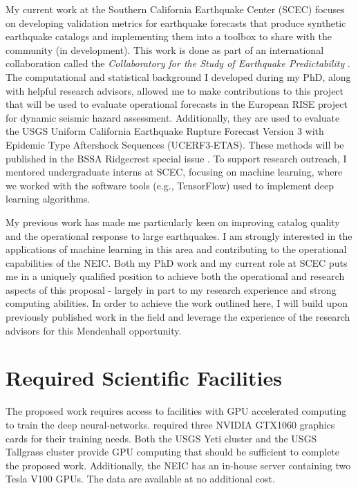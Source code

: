 \documentclass[12p]{article}
\begin{document}
My current work at the Southern California Earthquake Center (SCEC) focuses on developing validation metrics for
earthquake forecasts that produce synthetic earthquake catalogs and implementing them into a toolbox to share with the
community (in development). This work is done as part of an international collaboration called the \emph{Collaboratory
for the Study of Earthquake Predictability} \citep{Jordan2006, Schorlemmer2007b}. The computational and statistical
background I developed during my PhD, along with helpful research advisors, allowed me to make contributions to this
project that will be used to evaluate operational forecasts in the European RISE project for dynamic seismic hazard
assessment. Additionally, they are used to evaluate the USGS Uniform California Earthquake Rupture Forecast Version 3
with Epidemic Type Aftershock Sequences (UCERF3-ETAS). These methods will be published in the BSSA Ridgecrest special
issue \citep{Savran2020}. To support research outreach, I mentored undergraduate interns at SCEC, focusing on machine
learning, where we worked with the software tools (e.g., TensorFlow) used to implement deep learning algorithms.

My previous work has made me particularly keen on improving catalog quality and the operational response to large
earthquakes. I am strongly interested in the applications of machine learning in this area and contributing to the
operational capabilities of the NEIC. Both my PhD work and my current role at SCEC puts me in a uniquely qualified
position to achieve both the operational and research aspects of this proposal - largely in part to my research
experience and strong computing abilities. In order to achieve the work outlined here, I will build upon previously
published work in the field and leverage the experience of the research advisors for this Mendenhall opportunity.

\section{Required Scientific Facilities} The proposed work requires access to facilities with GPU accelerated computing
to train the deep neural-networks. \citet{Ross2018b} required three NVIDIA GTX1060 graphics cards for their training
needs. Both the USGS Yeti cluster and the USGS Tallgrass cluster provide GPU computing that should be sufficient to
complete the proposed work. Additionally, the NEIC has an in-house server containing two Tesla V100 GPUs. The data are
available at no additional cost.

\newpage
\AtBeginShipout{%
\AtBeginShipoutDiscard
}


\end{document}
